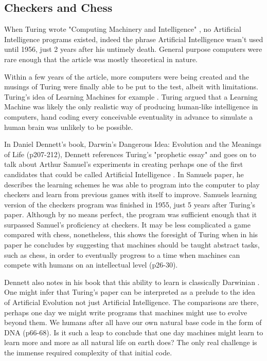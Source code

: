 \documentclass{scrartcl}
\begin{document}
\subsection{Checkers and Chess}

When Turing wrote "Computing Machinery and Intelligence" \cite{turing1950computing:1}, no Artificial Intelligence programs existed, indeed the phrase Artificial Intelligence wasn't used until 1956, just 2 years after his untimely death. General purpose computers were rare enough that the article was mostly theoretical in nature. \par
Within a few years of the article, more computers were being created and the musings of Turing were finally able to be put to the test, albeit with limitations. Turing's idea of Learning Machines for example \cite{ramscar2010computing:9}. Turing argued that a Learning Machine was likely the only realistic way of producing human-like intelligence in computers, hand coding every conceivable eventuality in advance to simulate a human brain was unlikely to be possible. 

In Daniel Dennett's book, Darwin's Dangerous Idea: Evolution and the Meanings of Life \cite{dennett1996darwin:10} (p207-212), Dennett references Turing's "prophetic essay" and goes on to talk about Arthur Samuel's experiments in creating perhaps one of the first candidates that could be called Artificial Intelligence \cite{samuel2000some:11}. In Samuels paper, he describes the learning schemes he was able to program into the computer to play checkers and learn from previous games with itself to improve. Samuels learning version of the checkers program was finished in 1955, just 5 years after Turing's paper. Although by no means perfect, the program was sufficient enough that it surpassed Samuel's proficiency at checkers. It may be less complicated a game compared with chess, nonetheless, this shows the foresight of Turing when in his paper he concludes by suggesting that machines should be taught abstract tasks, such as chess, in order to eventually progress to a time when machines can compete with humans on an intellectual level \cite{dawkins2016selfish:12} (p26-30). 

Dennett also notes in his book that this ability to learn is classically Darwinian \cite{darwin2009origin:13}. One might infer that Turing's paper can be interpreted as a prelude to the idea of Artificial Evolution not just Artificial Intelligence. The comparisons are there, perhaps one day we might write programs that machines might use to evolve beyond them. We humans after all have our own natural base code in the form of DNA \cite{dawkins2016selfish:12} (p66-68). Is it such a leap to conclude that one day machines might learn to learn more and more as all natural life on earth does? The only real challenge is the immense required complexity of that initial code.
\end{document}
